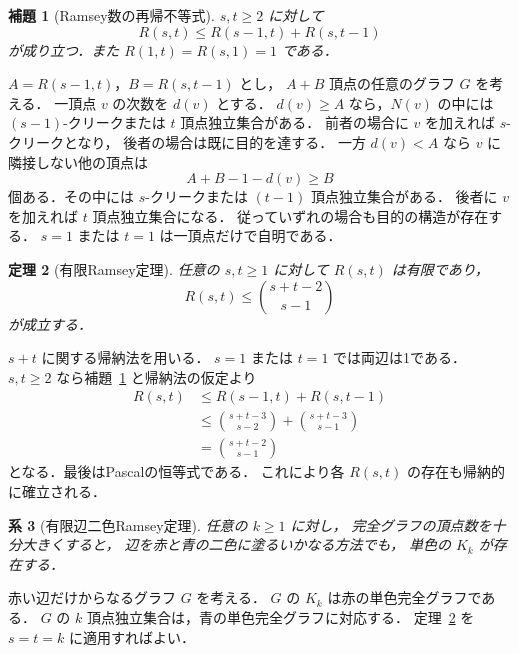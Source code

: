 \documentclass[a5paper,10pt,onecolumn]{jsarticle}
\makeatletter
\theoremstyle{mathnotetheorem}
\newtheorem{theorem}{定理}[section]
\newtheorem{lemma}[theorem]{補題}
\newtheorem{corollary}[theorem]{系}
\renewcommand{\proofname}{証明}
\renewenvironment{proof}[1][\proofname]{%
  \par\pushQED{\qed}\normalfont\topsep4\p@\@plus2\p@\relax
  \trivlist\item[\hskip\labelsep\bfseries #1]\ignorespaces
}{\popQED\endtrivlist\@endpefalse}
\makeatother
\begin{document}
\begin{lemma}[Ramsey数の再帰不等式]\label{lem:ramseyrec}
$s,t\ge2$ に対して
\begin{equation}\label{eq:ramseyrec}
 R(s,t)\le R(s-1,t)+R(s,t-1)
\end{equation}
が成り立つ．また $R(1,t)=R(s,1)=1$ である．
\end{lemma}
\begin{proof}
$A=R(s-1,t)$，$B=R(s,t-1)$ とし，
$A+B$ 頂点の任意のグラフ $G$ を考える．
一頂点 $v$ の次数を $d(v)$ とする．
$d(v)\ge A$ なら，$N(v)$ の中には
$(s-1)$-クリークまたは $t$ 頂点独立集合がある．
前者の場合に $v$ を加えれば $s$-クリークとなり，
後者の場合は既に目的を達する．
一方 $d(v)<A$ なら $v$ に隣接しない他の頂点は
\[
 A+B-1-d(v)\ge B
\]
個ある．その中には $s$-クリークまたは
$(t-1)$ 頂点独立集合がある．
後者に $v$ を加えれば $t$ 頂点独立集合になる．
従っていずれの場合も目的の構造が存在する．
$s=1$ または $t=1$ は一頂点だけで自明である．
\end{proof}

\begin{theorem}[有限Ramsey定理]\label{thm:ramsey}
任意の $s,t\ge1$ に対して $R(s,t)$ は有限であり，
\begin{equation}\label{eq:ramseybinom}
 R(s,t)\le {s+t-2\choose s-1}
\end{equation}
が成立する．
\end{theorem}
\begin{proof}
$s+t$ に関する帰納法を用いる．
$s=1$ または $t=1$ では両辺は1である．
$s,t\ge2$ なら補題~\ref{lem:ramseyrec} と帰納法の仮定より
\begin{align*}
 R(s,t)&\le R(s-1,t)+R(s,t-1)\\
 &\le {s+t-3\choose s-2}+{s+t-3\choose s-1}\\
 &= {s+t-2\choose s-1}
\end{align*}
となる．最後はPascalの恒等式である．
これにより各 $R(s,t)$ の存在も帰納的に確立される．
\end{proof}

\begin{corollary}[有限辺二色Ramsey定理]
任意の $k\ge1$ に対し，
完全グラフの頂点数を十分大きくすると，
辺を赤と青の二色に塗るいかなる方法でも，
単色の $K_k$ が存在する．
\end{corollary}
\begin{proof}
赤い辺だけからなるグラフ $G$ を考える．
$G$ の $K_k$ は赤の単色完全グラフである．
$G$ の $k$ 頂点独立集合は，青の単色完全グラフに対応する．
定理~\ref{thm:ramsey} を $s=t=k$ に適用すればよい．
\end{proof}
\end{document}
